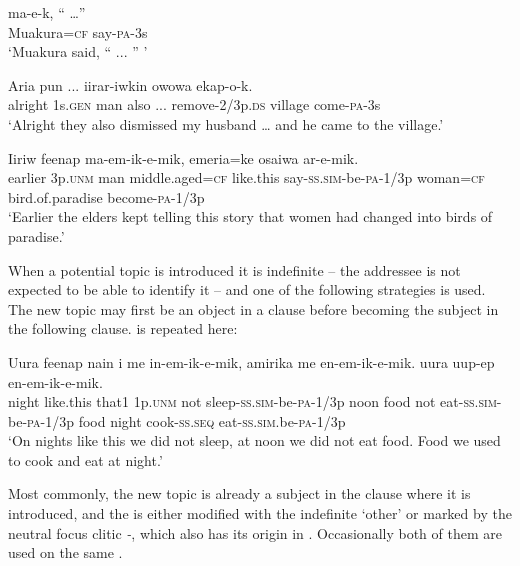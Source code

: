 \ea%
\label{ex:9:x1664}
\gll {}  ma-e-k,  ``  {\dots''} \\
Muakura=\textsc{cf}  say-\textsc{pa}-3s      \\
\glt`Muakura said, `` ... '' '
\z


\ea%
\label{ex:9:x1665}
\gll Aria    pun  ...  iirar-iwkin  owowa  ekap-o-k. \\
alright  1s.\textsc{gen}  man  also  ...  remove-2/3p.\textsc{ds}  village  come-\textsc{pa}-3s      \\
\glt`Alright they also dismissed my husband {\dots} and he came to the village.'
\z


\ea%
\label{ex:9:x1667}
\gll Iiriw      feenap ma-em-ik-e-mik,  emeria=ke  osaiwa  ar-e-mik. \\
earlier  3p.\textsc{unm}  man  middle.aged=\textsc{cf}  like.this say-\textsc{ss}.\textsc{sim}-be-\textsc{pa}-1/3p  woman=\textsc{cf}  bird.of.paradise  become-\textsc{pa}-1/3p    \\
\glt`Earlier the elders kept telling this story that women had changed into birds of paradise.'
\z


When a potential topic is introduced it is indefinite -- the addressee is not expected to be able to identify it -- and one of the following strategies is used. The new topic may  first be an object in a clause before becoming the subject in the following clause.  is repeated here: 

\ea%
\label{ex:9:x1668}
\gll Uura  feenap  nain  i  me  in-em-ik-e-mik, amirika    me  en-em-ik-e-mik.   uura  uup-ep  en-em-ik-e-mik.\\
night  like.this  that1  1p.\textsc{unm}  not  sleep-\textsc{ss}.\textsc{sim}-be-\textsc{pa}-1/3p noon  food  not  eat-\textsc{ss}.\textsc{sim}-be-\textsc{pa}-1/3p food  night  cook-\textsc{ss}.\textsc{seq}  eat-\textsc{ss}.\textsc{sim}.be-\textsc{pa}-1/3p    \\
\glt`On nights like this we did not sleep, at noon we did not eat food. Food we used to cook and eat at night.'
\z


Most commonly, the new topic is already a subject in the clause where it is introduced, and the  is either modified with the indefinite  `other' or marked by the neutral focus clitic \textit{-}, which also has its origin in . Occasionally both of them are used on the same  . 

